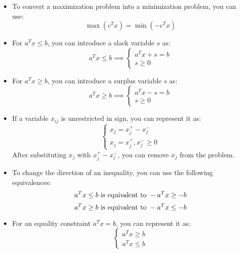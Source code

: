 \begin{itemize}
    \item To convert a maximization problem into a minimization problem, you can use: 
        \[\max{(c^Tx)}=\min{(-c^Tx)}\]
    \item For $a^Tx \leq b$, you can introduce a slack variable $s$ as: 
        \[a^Tx \leq b \implies
        \begin{cases}
            a^Tx+s=b \\
            s \geq 0
        \end{cases}
        \]
    \item For $a^Tx \geq b$, you can introduce a surplus variable $s$ as: 
        \[a^Tx \geq b \implies 
        \begin{cases}
            a^Tx-s=b \\
            s \geq 0
        \end{cases}
        \]
    \item If a variable $x_{ij}$ is unrestricted in sign, you can represent it as:
        \[\begin{cases}
            x_j=x_j^{+}-x_j^{-} \\
            x_j=x_j^{+},x_j^{-} \geq 0
        \end{cases}
        \]
        After substituting $x_j$ with $x_j^{+}-x_j^{-}$, you can remove $x_j$ from the problem. 
    \item To change the direction of an inequality, you can use the following equivalences:
        \[a^Tx \leq b \textnormal{ is equivalent to } -a^Tx \geq -b\]
        \[a^Tx \geq b \textnormal{ is equivalent to } -a^Tx \leq -b\]
    \item For an equality constraint $a^Tx = b$, you can represent it as:
        \[
        \begin{cases}
            a^Tx \geq b \\
            a^Tx \leq b
        \end{cases}
        \]
\end{itemize}
